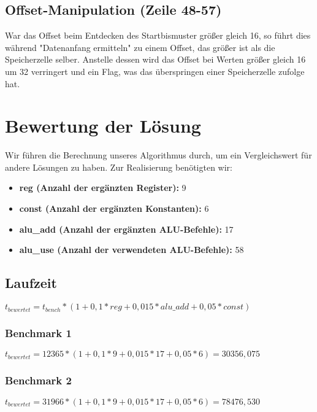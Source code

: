 \documentclass[12pt,titlepage,german,a4]{article}
\begin{document}
    \subsection{Offset-Manipulation (Zeile 48-57)}
    War das Offset beim Entdecken des Startbismuster gr{\"o}ßer gleich 16, so f{\"u}hrt dies w{\"a}hrend "Datenanfang ermitteln" zu einem Offset, das gr{\"o}ßer ist als die Speicherzelle selber. Anstelle dessen wird das Offset bei Werten gr{\"o}ßer gleich 16 um 32 verringert und ein Flag, was das {\"u}berspringen einer Speicherzelle zufolge hat.

    \newpage

    \section{Bewertung der L{\"o}sung}
    Wir f{\"u}hren die Berechnung unseres Algorithmus durch, um ein Vergleichswert f{\"u}r andere L{\"o}sungen zu haben. Zur Realisierung ben{\"o}tigten wir:
    \begin{itemize}
        \item \textbf{reg (Anzahl der erg{\"a}nzten Register):} 9
        \item \textbf{const (Anzahl der erg{\"a}nzten Konstanten):} 6
        \item \textbf{alu{\_}add (Anzahl der erg{\"a}nzten ALU-Befehle):} 17
        \item \textbf{alu{\_}use (Anzahl der verwendeten ALU-Befehle):} 58
    \end{itemize}



    \subsection{Laufzeit}

    $t_{bewertet} = t_{bench} * (1 + 0,1*reg + 0,015*alu{\_}add + 0,05*const)$

    \subsubsection{Benchmark 1}
    $t_{bewertet} = 12365 * (1 + 0,1*9 + 0,015*17 + 0,05*6) = 30356,075$

    \subsubsection{Benchmark 2}
    $t_{bewertet} = 31966 * (1 + 0,1*9 + 0,015*17 + 0,05*6) = 78476,530$
\end{document}
